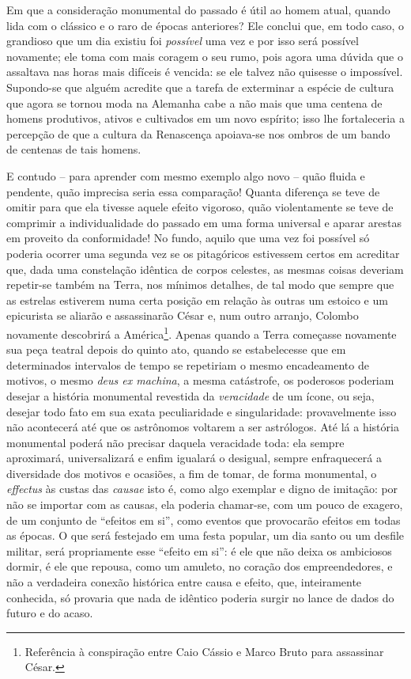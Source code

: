 Em que a consideração monumental do passado é útil ao homem atual,
quando lida com o clássico e o raro de épocas anteriores? Ele conclui
que, em todo caso, o grandioso que um dia existiu foi \emph{possível}
uma vez e por isso será possível novamente; ele toma com mais coragem o
seu rumo, pois agora uma dúvida que o assaltava nas horas mais difíceis
é vencida: se ele talvez não quisesse o impossível. Supondo-se que
alguém acredite que a tarefa de exterminar a espécie de cultura que
agora se tornou moda na Alemanha cabe a não mais que uma centena de
homens produtivos, ativos e cultivados em um novo espírito; isso lhe
fortaleceria a percepção de que a cultura da Renascença apoiava-se nos
ombros de um bando de centenas de tais homens.

E contudo -- para aprender com mesmo exemplo algo novo -- quão fluida e
pendente, quão imprecisa seria essa comparação! Quanta diferença se teve
de omitir para que ela tivesse aquele efeito vigoroso, quão
violentamente se teve de comprimir a individualidade do passado em uma
forma universal e aparar arestas em proveito da conformidade! No fundo,
aquilo que uma vez foi possível só poderia ocorrer uma segunda vez se os
pitagóricos estivessem certos em acreditar que, dada uma constelação
idêntica de corpos celestes, as mesmas coisas deveriam repetir-se também
na Terra, nos mínimos detalhes, de tal modo que sempre que as estrelas
estiverem numa certa posição em relação às outras um estoico e um
epicurista se aliarão e assassinarão César e, num outro arranjo, Colombo
novamente descobrirá a América\footnote{Referência à conspiração entre
  Caio Cássio e Marco Bruto para assassinar César.}. Apenas quando a
Terra começasse novamente sua peça teatral depois do quinto ato, quando
se estabelecesse que em determinados intervalos de tempo se repetiriam o
mesmo encadeamento de motivos, o mesmo \emph{deus ex machina}, a mesma
catástrofe, os poderosos poderiam desejar a história monumental
revestida da \emph{veracidade} de um ícone, ou seja, desejar todo fato
em sua exata peculiaridade e singularidade: provavelmente isso não
acontecerá até que os astrônomos voltarem a ser astrólogos. Até lá a
história monumental poderá não precisar daquela veracidade toda: ela
sempre aproximará, universalizará e enfim igualará o desigual, sempre
enfraquecerá a diversidade dos motivos e ocasiões, a fim de tomar, de
forma monumental, o \emph{effectus} às custas das \emph{causae} isto é,
como algo exemplar e digno de imitação: por não se importar com as
causas, ela poderia chamar-se, com um pouco de exagero, de um conjunto
de ``efeitos em si'', como eventos que provocarão efeitos em todas as
épocas. O que será festejado em uma festa popular, um dia santo ou um
desfile militar, será propriamente esse ``efeito em si'': é ele que não
deixa os ambiciosos dormir, é ele que repousa, como um amuleto, no
coração dos empreendedores, e não a verdadeira conexão histórica entre
causa e efeito, que, inteiramente conhecida, só provaria que nada de
idêntico poderia surgir no lance de dados do futuro e do acaso.

